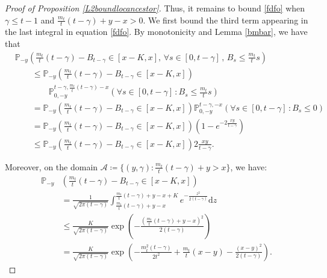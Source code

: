 \documentclass{article}
\newcommand{\Prob}{\mathbb{P}}
\begin{document}
\begin{proof}[Proof of Proposition \ref{L2boundlocancestor}]
Thus, it remains to bound \eqref{fdfo} when $\gamma \leq t-1$ and $\frac{m_t}{t}(t-\gamma) +y -x > 0$.
We first bound the third term appearing in the last integral in equation \eqref{fdfo}. By monotonicity and Lemma \ref{bmbar}, we have that
\begin{equation}
    \begin{split}
         &\Prob_{-y}\left(  \frac{m_t}{t}(t- \gamma) - B_{t- \gamma} \in [x-K,x] , \, \forall s \in [0,t-\gamma] \, , \, B_{s} \leq \frac{m_t}{t}s \right)
         \\& \qquad \leq \Prob_{-y}\left(  \frac{m_t}{t}(t- \gamma) - B_{t- \gamma} \in [x-K,x] \right) 
         \\&  \qquad \qquad \Prob_{0,-y}^{t-\gamma,\frac{m_t}{t}(t- \gamma)-x }\left(\forall s \in [0,t-\gamma] \, : B_{s} \leq \frac{m_t}{t}s \right)
         \\&  \qquad =\Prob_{-y}\left(  \frac{m_t}{t}(t- \gamma) - B_{t- \gamma} \in [x-K,x] \right) \Prob_{0,-y}^{t-\gamma,-x }\left(\forall s \in [0,t-\gamma] \, : B_{s} \leq 0\right)
        \\&  \qquad = \Prob_{-y}\left(  \frac{m_t}{t}(t- \gamma) - B_{t- \gamma} \in [x-K,x]\right) \left(1- e^{-2\frac{xy}{t- \gamma}}\right)
        \\& \qquad \leq \Prob_{-y}\left( \frac{m_t}{t}(t- \gamma) - B_{t- \gamma} \in [x-K,x] \right)2\frac{xy}{t- \gamma}.
    \end{split}
\end{equation}

Moreover, on the domain $\mathcal{A} \coloneqq \{(y,\gamma) : \frac{m_t}{t}(t-\gamma) + y > x\}$, we have:
\begin{equation}
    \begin{aligned}
        \Prob_{-y}&\left(\tfrac{m_t}{t}(t-\gamma) - B_{t-\gamma} \in [x-K,x]\right) \\
        &= \frac{1}{\sqrt{2\pi(t-\gamma)}} \int_{\frac{m_t}{t}(t-\gamma) + y - x}^{\frac{m_t}{t}(t-\gamma) + y - x + K} 
            e^{-\frac{z^2}{2(t-\gamma)}} \mathrm{d}z \\
        &\leq \frac{K}{\sqrt{2\pi(t-\gamma)}} \exp\left(-\frac{\left(\tfrac{m_t}{t}(t-\gamma) + y - x\right)^2}{2(t-\gamma)}\right) \\
        &= \frac{K}{\sqrt{2\pi(t-\gamma)}} \exp\left(
            -\tfrac{m_t^2(t-\gamma)}{2t^2} + \tfrac{m_t}{t}(x-y) - \tfrac{(x-y)^2}{2(t-\gamma)}
        \right).
    \end{aligned}
\end{equation}


\end{proof}
\end{document}
